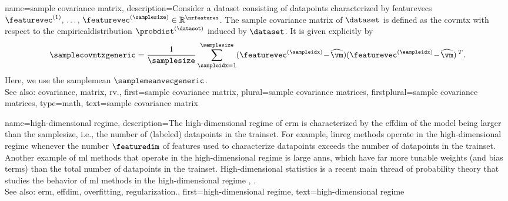 {name={sample covariance matrix}, 
	description={Consider a \gls{dataset} consisting of \glspl{datapoint} 
				 characterized by \glspl{featurevec} $\featurevec^{(1)}, \,\ldots, \,\featurevec^{(\samplesize)} \in \mathbb{R}^{\nrfeatures}$.	
				 The sample \gls{covariance} 
				 \gls{matrix} of $\dataset$ is defined as the \gls{covmtx} with 
				 respect to the \gls{empiricaldistribution} $\probdist^{(\dataset)}$ 
				 induced by $\dataset$. 
				 It is given explicitly by 
					$$\samplecovmtxgeneric = \frac{1}{\samplesize} \sum_{\sampleidx=1}^{\samplesize} (\featurevec^{(\sampleidx)}\!-\!\widehat{\vm}) (\featurevec^{(\sampleidx)}\!-\!\widehat{\vm})\,^{T}.$$ 
				Here, we use the \gls{samplemean} $\samplemeanvecgeneric$. 
	\\
		See also: \gls{covariance}, \gls{matrix}, \gls{rv}.},
	first={sample covariance matrix},
	plural={sample covariance matrices},
	firstplural={sample covariance matrices},
	type=math, 
	text={sample covariance matrix} 
}

	
{name={high-dimensional regime}, 
	description={The 
		high-dimensional regime of \gls{erm} is characterized by the \gls{effdim} of the \gls{model} 
		being larger than the \gls{samplesize}, i.e., the number of (labeled) \glspl{datapoint} in the \gls{trainset}. 
		For example, \gls{linreg} methods operate in the high-dimensional regime whenever the number $\featuredim$ of \glspl{feature} 
		used to characterize \glspl{datapoint} exceeds the number of \glspl{datapoint} in the \gls{trainset}. 
		Another example of \gls{ml} methods that operate in the high-dimensional regime is large \glspl{ann}, which have 
		far more tunable \gls{weights} (and bias terms) than the total number of \glspl{datapoint} in the \gls{trainset}. 
		High-dimensional statistics is a recent main thread of \gls{probability} theory that studies the 
		behavior of \gls{ml} methods in the high-dimensional regime \cite{Wain2019}, \cite{BuhlGeerBook}.
				\\
		See also: \gls{erm}, \gls{effdim}, \gls{overfitting}, \gls{regularization}.},
   	first={high-dimensional regime},
	text={high-dimensional regime} 
}

